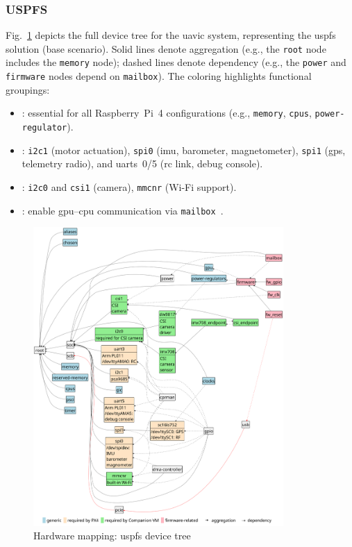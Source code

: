 \subsubsection{USPFS}
\label{sec:base-scenario}
Fig.~\ref{fig:hw-map-1} depicts the full device tree for the \gls{uavic} system,
representing the \gls{uspfs} solution (base scenario).
Solid lines denote aggregation (e.g., the \lstinline{root} node includes the \lstinline{memory} node);
dashed lines denote dependency (e.g., the \lstinline{power} and \lstinline{firmware} nodes depend on \lstinline{mailbox}).
%
The coloring highlights functional groupings:
\begin{itemize}
  \item {}: essential for all Raspberry~Pi~4 configurations
    (e.g., \lstinline{memory}, \lstinline{cpus}, \lstinline{power-regulator}).
  \item {}: \lstinline{i2c1} (motor actuation),
    \lstinline{spi0} (\gls{imu}, barometer, magnetometer), \lstinline{spi1} (\gls{gps}, telemetry radio),
    and \glspl{uart}~0/5 (\gls{rc} link, debug console).
  \item {}: \lstinline{i2c0} and \lstinline{csi1} (camera),
    \lstinline{mmcnr} (Wi-Fi support).
  \item {}: enable \gls{gpu}–\gls{cpu} communication via \lstinline{mailbox}~\cite{rpi4-fw-mbox}.
\end{itemize}

\begin{figure}[!hbt]
  \centering
  \includegraphics[width=0.85\textwidth]{./img/pdf/hw-map-1}
  \caption[Hardware mapping: USPFS device tree]{Hardware mapping: \gls{uspfs} device tree}
  \label{fig:hw-map-1}
\end{figure}

